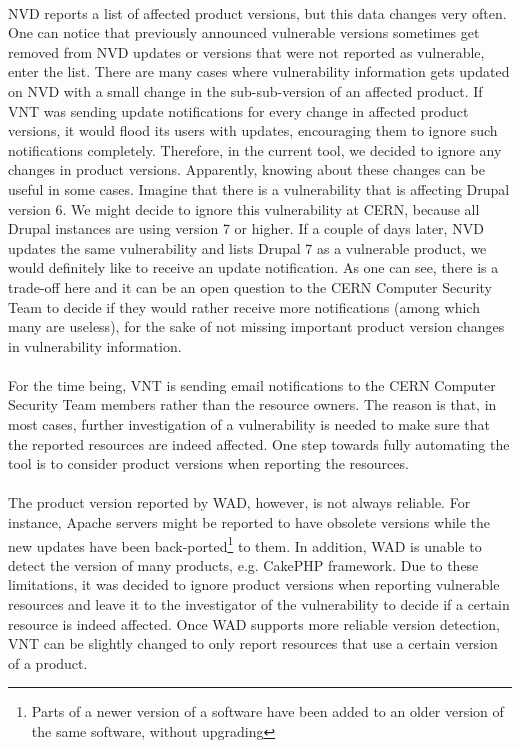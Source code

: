 \paragraph{}
NVD reports a list of affected product versions, but this data changes very often. One can notice that previously announced vulnerable versions sometimes get removed from NVD updates or versions that were not reported as vulnerable, enter the list. There are many cases where vulnerability information gets updated on NVD with a small change in the sub-sub-version of an affected product. If VNT was sending update notifications for every change in affected product versions, it would flood its users with updates, encouraging them to ignore such notifications completely. Therefore, in the current tool, we decided to ignore any changes in product versions. Apparently, knowing about these changes can be useful in some cases. Imagine that there is a vulnerability that is affecting Drupal version 6. We might decide to ignore this vulnerability at CERN, because all Drupal instances are using version 7 or higher. If a couple of days later, NVD updates the same vulnerability and lists Drupal 7 as a vulnerable product, we would definitely like to receive an update notification. As one can see, there is a trade-off here and it can be an open question to the CERN Computer Security Team to decide if they would rather receive more notifications (among which many are useless), for the sake of not missing important product version changes in vulnerability information.
\paragraph{}
For the time being, VNT is sending email notifications to the CERN Computer Security Team members rather than the resource owners. The reason is that, in most cases, further investigation of a vulnerability is needed to make sure that the reported resources are indeed affected. One step towards fully automating the tool is to consider product versions when reporting the resources.
\paragraph{}
The product version reported by WAD, however, is not always reliable. For instance, Apache servers might be reported to have obsolete versions while the new updates have been back-ported\footnote{Parts of a newer version of a software have been added to an older version of the same software, without upgrading} to them. In addition, WAD is unable to detect the version of many products, e.g. CakePHP framework. Due to these limitations, it was decided to ignore product versions when reporting vulnerable resources and leave it to the investigator of the vulnerability to decide if a certain resource is indeed affected. Once WAD supports more reliable version detection, VNT can be slightly changed to only report resources that use a certain version of a product.
